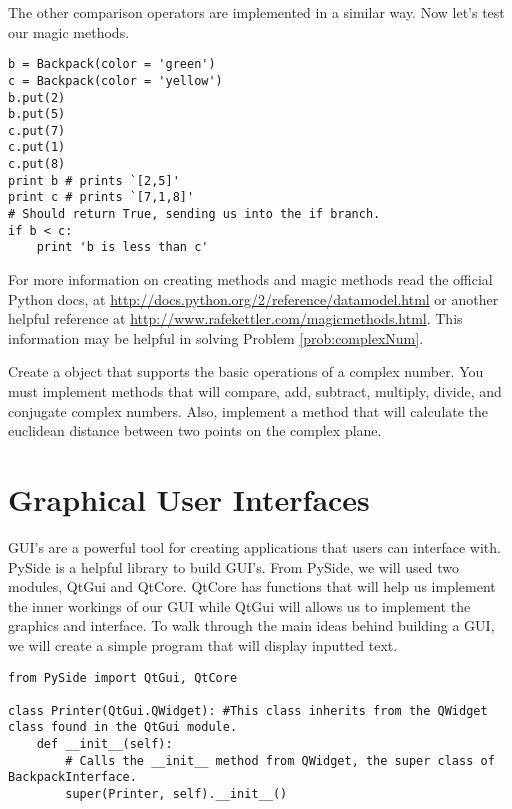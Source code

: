 The other comparison operators are implemented in a similar way.
Now let's test our magic methods.

\begin{lstlisting}
b = Backpack(color = 'green')
c = Backpack(color = 'yellow')
b.put(2)
b.put(5)
c.put(7)
c.put(1)
c.put(8)
print b # prints `[2,5]'
print c # prints `[7,1,8]'
# Should return True, sending us into the if branch.
if b < c: 
	print 'b is less than c'

\end{lstlisting}

For more information on creating methods and magic methods read the official Python docs, at \url {http://docs.python.org/2/reference/datamodel.html} or another helpful reference at \url{http://www.rafekettler.com/magicmethods.html}.
This information may be helpful in solving Problem \ref{prob:complexNum}.

\begin{problem}
Create a  object that supports the basic operations of a complex number.
You must implement methods that will compare, add, subtract, multiply, divide, and conjugate complex numbers.
Also, implement a  method that will calculate the euclidean distance between two points on the complex plane.
\label{prob:complexNum}
\end{problem}

\section*{Graphical User Interfaces}

GUI's are a powerful tool for creating applications that users can interface with.
PySide is a helpful library to build GUI's.
From PySide, we will used two modules, QtGui and QtCore.
QtCore has functions that will help us implement the inner workings of our GUI while QtGui will allows us to implement the graphics and interface. 
To walk through the main ideas behind building a GUI, we will create a simple program that will display inputted text.

\begin{lstlisting}
from PySide import QtGui, QtCore

class Printer(QtGui.QWidget): #This class inherits from the QWidget class found in the QtGui module.
	def __init__(self):
		# Calls the __init__ method from QWidget, the super class of BackpackInterface.
		super(Printer, self).__init__() 

\end{lstlisting}

